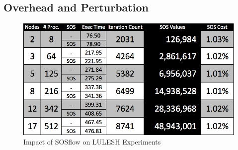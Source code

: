 \subsection{Overhead and Perturbation}

\begin{figure}[!t]
\centering
\includegraphics[width=5in]{images/cori_results.png}
\caption{Impact of SOSflow on LULESH Experiments}
\label{cori_results}
\end{figure}


